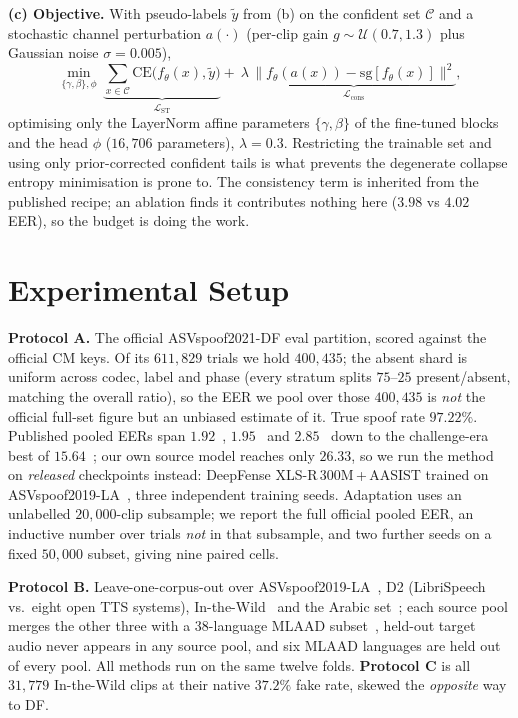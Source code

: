 \documentclass[conference]{IEEEtran}
\begin{document}
\textbf{(c) Objective.} With pseudo-labels $\tilde y$ from (b) on the confident
set $\mathcal{C}$ and a stochastic channel perturbation $a(\cdot)$ (per-clip
gain $g\sim\mathcal U(0.7,1.3)$ plus Gaussian noise $\sigma{=}0.005$),
\begin{equation}
\min_{\{\gamma,\beta\},\phi}\
\underbrace{\textstyle\sum_{x\in\mathcal C}\!\mathrm{CE}\big(f_\theta(x),\tilde y\big)}_{\mathcal L_{\mathrm{ST}}}
+\ \lambda\,\underbrace{\big\|f_\theta(a(x))-\mathrm{sg}[f_\theta(x)]\big\|^2}_{\mathcal L_{\mathrm{cons}}},
\end{equation}
optimising only the LayerNorm affine parameters $\{\gamma,\beta\}$ of the
fine-tuned blocks and the head $\phi$ ($16{,}706$ parameters), $\lambda{=}0.3$.
Restricting the trainable set and using only prior-corrected confident tails is
what prevents the degenerate collapse entropy minimisation is prone to. The
consistency term is inherited from the published recipe; an ablation finds it
contributes nothing here ($3.98$ vs $4.02$ EER), so the budget is doing the work.

\section{Experimental Setup}
\textbf{Protocol A.} The official ASVspoof2021-DF eval partition, scored against
the official CM keys. Of its $611{,}829$ trials we hold
$400{,}435$; the absent shard is uniform across codec, label and phase (every
stratum splits $75$--$25$ present/absent, matching the overall ratio), so the EER
we pool over those $400{,}435$ is \emph{not} the official full-set figure but an
unbiased estimate of it. True spoof rate $97.22\%$. Published pooled EERs span $1.92$~\cite{xlsrsls},
$1.95$~\cite{wav2dftsl} and $2.85$~\cite{wav2vec2aug} down to the challenge-era
best of $15.64$~\cite{asvspoof21}; our own source model reaches only $26.33$, so
we run the method on \emph{released} checkpoints instead: DeepFense
XLS-R\,300M\,+\,AASIST trained on ASVspoof2019-LA~\cite{deepfensehf}, three
independent training seeds. Adaptation uses an unlabelled $20{,}000$-clip
subsample; we report the full official pooled EER, an inductive number over
trials \emph{not} in that subsample, and two further seeds on a fixed $50{,}000$
subset, giving nine paired cells.

\textbf{Protocol B.} Leave-one-corpus-out over ASVspoof2019-LA~\cite{asvspoof19},
D2 (LibriSpeech vs.\ eight open TTS systems), In-the-Wild~\cite{itw} and the
Arabic set~\cite{arad}; each source pool merges the other three with a
38-language MLAAD subset~\cite{mlaad}, held-out target audio never appears in any
source pool, and six MLAAD languages are held out of every pool. All methods run
on the same twelve folds. \textbf{Protocol C} is all $31{,}779$ In-the-Wild clips
at their native $37.2\%$ fake rate, skewed the \emph{opposite} way to DF.
\end{document}
